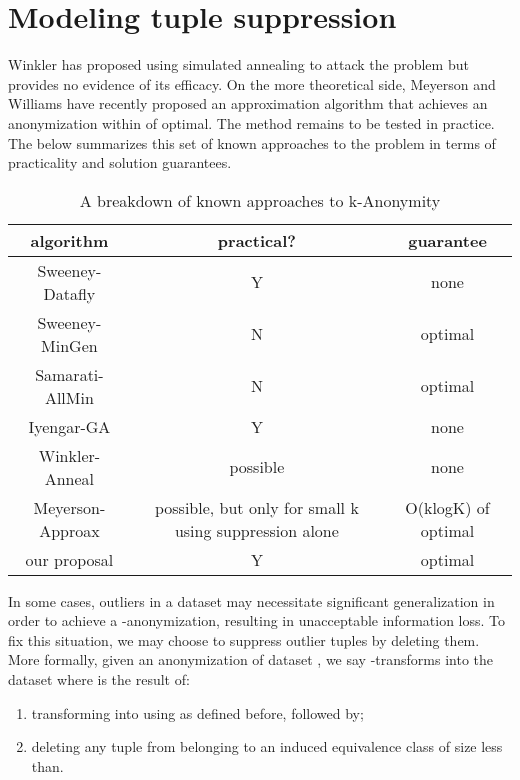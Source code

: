 \documentclass[]{seismica}
\begin{document}
\tableofcontents
\newpage
    
	\section{Modeling tuple suppression}
	
	Winkler has proposed using simulated annealing to attack the problem but provides no evidence of its efficacy. On the more theoretical side, Meyerson and Williams have recently proposed an approximation algorithm that achieves an anonymization within of optimal. The method remains to be tested in practice. The  below summarizes this set of known approaches    to the problem in terms of practicality and solution guarantees.

\begin{table}[ht!]
  \begin{tabular}{|c|c|c|}
    \hline
    algorithm & practical? & guarantee\\
    \hline
    Sweeney-Datafly & Y & none\\
    \hline
    Sweeney-MinGen & N & optimal\\
    \hline
    Samarati-AllMin & N & optimal\\
    \hline
    Iyengar-GA & Y & none\\
    \hline
    Winkler-Anneal & possible & none\\
    \hline
    Meyerson-Approax & possible, but only for small k using suppression alone & O(klogK) of optimal\\
    \hline
    our proposal & Y & optimal\\
    \hline
    
  \end{tabular}
  \caption{A breakdown of known approaches to k-Anonymity}
  \label{tab:1}
\end{table}

In some cases, outliers in a dataset may necessitate significant generalization in order to achieve a -anonymization, resulting in unacceptable information loss. To fix this situation, we may choose to suppress outlier tuples by deleting them. More formally, given an anonymization of dataset , we say -transforms into the dataset where is the result of:

   \begin{enumerate}
       \item transforming into using as defined before, followed by;
       \item deleting any tuple from belonging to an induced equivalence class of size less than.
   \end{enumerate}
\end{document}
